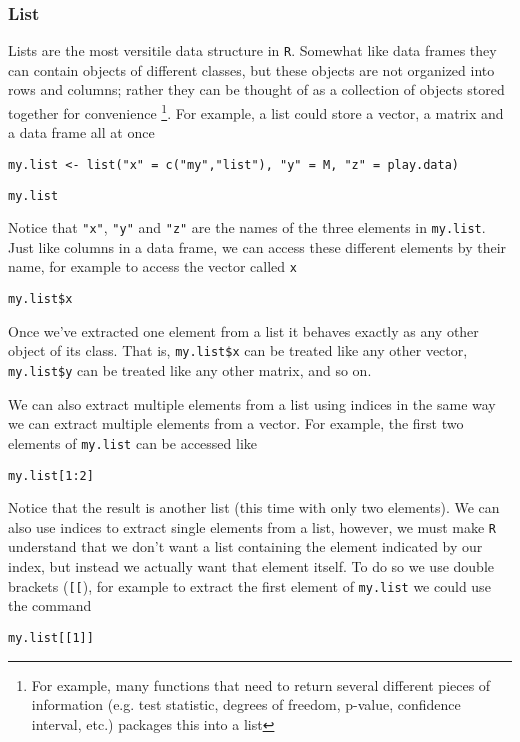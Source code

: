 \documentclass[12pt]{article}
\newcommand{\R}[1] {
	\item \texttt{#1}
}
\newenvironment{verbatim}{ 
	\indent
	\begin{list}{}{\setlength{\itemsep}{-1.5mm}}
}{
	\end{list}
}
\begin{document}
\subsubsection{List}	\label{sec:list}
Lists are the most versitile data structure in \verb+R+.  Somewhat like data frames they can contain objects of different classes, but these objects are not organized into rows and columns; rather they can be thought of as a collection of objects stored together for convenience \footnote{For example, many functions that need to return several different pieces of information (e.g. test statistic, degrees of freedom, p-value, confidence interval, etc.) packages this into a list}.  For example, a list could store a vector, a matrix and a data frame all at once
\begin{verbatim}
	\R{my.list <- list("x" = c("my","list"), "y" = M, "z" = play.data)}
	\R{my.list}
\end{verbatim}
Notice that \verb+"x"+, \verb+"y"+ and \verb+"z"+ are the names of the three elements in \verb+my.list+.  Just like columns in a data frame, we can access these different elements by their name, for example to access the vector called \verb+x+
\begin{verbatim}
	\R{my.list\$x}
\end{verbatim}
Once we've extracted one element from a list it behaves exactly as any other object of its class.  That is, \verb+my.list$x+ can be treated like any other vector, \verb+my.list$y+ can be treated like any other matrix, and so on.

We can also extract multiple elements from a list using indices in the same way we can extract multiple elements from a vector.  For example, the first two elements of \verb+my.list+ can be accessed like
\begin{verbatim}
	\R{my.list[1:2]}
\end{verbatim}
Notice that the result is another list (this time with only two elements).  We can also use indices to extract single elements from a list, however, we must make \verb+R+ understand that we don't want a list containing the element indicated by our index, but instead we actually want that element itself.  To do so we use double brackets (\verb+[[+), for example to extract the first element of \verb+my.list+ we could use the command
\begin{verbatim}
	\R{my.list[[1]]}
\end{verbatim}
\end{document}

